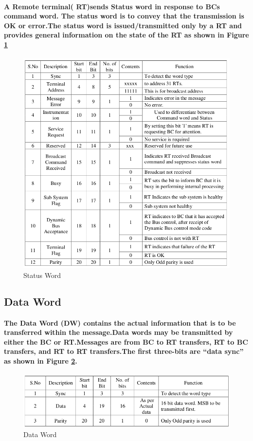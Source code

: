 \documentclass[12pt,a4paper]{report}
\begin{document}
\paragraph{\textrm{\textmd{A Remote terminal( RT)sends Status word in response to BCs command word. The status word is to convey that the transmission is OK or error.The status word is issued/transmitted only by a RT and provides general information on the state of the RT as shown in Figure \ref{fig:sts} }}}
\begin{figure}[h]
	\centering
	\includegraphics[scale=.38]{status.png}
	\caption{Status Word}
	\label{fig:sts}
\end{figure}
\subsection{Data Word}
\paragraph{\textrm{\textmd{ The Data Word (DW) contains the actual information that is to be transferred within the message.Data words may be transmitted by either the BC or RT.Messages are from BC to RT transfers, RT to BC transfers, and RT to RT transfers.The first three-bits are “data sync” as shown in Figure \ref{fig:data}.}}}
\begin{figure}[h]
	\centering
	\includegraphics[scale=.38]{data.png}
	\caption{Data Word}
	\label{fig:data}
\end{figure}
\end{document}
